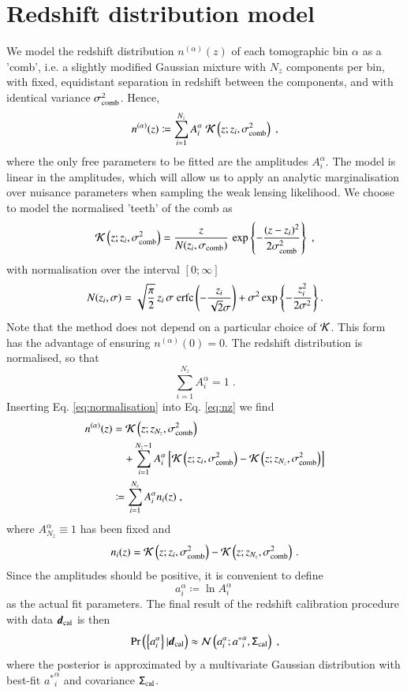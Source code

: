 \documentclass{aa}
\newcommand{\eq}[1]{\begin{equation}  #1 \end{equation}}
\newcommand{\eqa}[1]{\begin{align}   #1 \end{align}}
\newcommand{\br}[1]{\left( #1 \right)}
\newcommand{\bc}[1]{\left\{ #1 \right\}}
\newcommand{\bb}[1]{\left[ #1 \right]}
\newcommand{\nn}{\nonumber}
\newcommand{\pr}{{\rm Pr}}
\begin{document}
\section{Redshift distribution model}
\label{sec:comb}
We model the redshift distribution $n^{(\alpha)}(z)$ of each tomographic bin $\alpha$ as a 'comb', i.e. a slightly modified Gaussian mixture with $N_z$ components per bin, with fixed, equidistant separation in redshift between the components, and with identical variance $\sigma_{\rm comb}^2$. Hence,
\eq{
\label{eq:nz}
n^{(\alpha)}(z) \coloneqq \sum_{i=1}^{N_z} A_i^\alpha\; {\cal K}\br{z; z_i, \sigma_{\rm comb}^2}\;,
}
where the only free parameters to be fitted are the amplitudes $A_i^\alpha$. The model is linear in the amplitudes, which will allow us to apply an analytic marginalisation over nuisance parameters when sampling the weak lensing likelihood. We choose to model the normalised 'teeth' of the comb as
\eq{
{\cal K} \br{z; z_i, \sigma_{\rm comb}^2} = \frac{z}{N(z_i, \sigma_{\rm comb})}\, \exp \bc{- \frac{(z-z_i)^2}{2 \sigma_{\rm comb}^2} }\;, 
}
with normalisation over the interval $\bb{0;\infty}$
\eq{
N(z_i, \sigma) = \sqrt{\frac{\pi}{2}}\, z_i\, \sigma\; {\rm erfc} \br{-\frac{z_i}{\sqrt{2} \sigma}} + \sigma^2 \exp \bc{-\frac{z_i^2}{2 \sigma^2}}.
}
Note that the method does not depend on a particular choice of ${\cal K}$. This form has the advantage of ensuring $n^{(\alpha)}(0)=0$. The redshift distribution is normalised, so that
\eq{
\label{eq:normalisation}
\sum_{i=1}^{N_z} A_i^\alpha = 1\;.
}
Inserting Eq. \eqref{eq:normalisation} into Eq. \eqref{eq:nz} we find
\eqa{
\label{eq:comb_nz}
n^{(\alpha)}(z) &= {\cal K}\br{z; z_{N_z}, \sigma_{\rm comb}^2} \\ \nn
& ~~~~+ \sum_{i=1}^{N_z-1} A_i^\alpha \bb{ {\cal K}\br{z; z_i, \sigma_{\rm comb}^2}  - {\cal K}\br{z; z_{N_z}, \sigma_{\rm comb}^2} } \\ \nn
&\coloneqq \sum_{i=1}^{N_z} A_i^\alpha n_i(z)\;,
}
where $A_{N_z}^\alpha \equiv 1$ has been fixed and
\eq{
n_i(z) = {\cal K}\br{z; z_i, \sigma_{\rm comb}^2}  - {\cal K}\br{z; z_{N_z}, \sigma_{\rm comb}^2}\,.
}
Since the amplitudes should be positive, it is convenient to define
\eq{
a_i^\alpha \coloneqq \ln A_i^\alpha\;
}
as the actual fit parameters. The final result of the redshift calibration procedure with data $\boldsymbol{d}_{\rm cal}$ is then
\eq{
\label{eq:posterior}
\pr \br{ \bc{a_i^\alpha} | \boldsymbol{d}_{\rm cal}} \approx {\cal N}\br{ a_i^\alpha; {a^*}_i^\alpha, \tens{\Sigma}_{\rm cal}}\;,
}
where the posterior is approximated by a multivariate Gaussian distribution with best-fit ${a^*}_i^\alpha$ and covariance $\mathsf{\Sigma}_{\rm cal}$.
\end{document}
